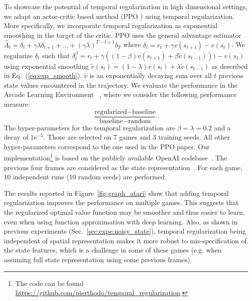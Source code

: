 \documentclass{article}
\newcommand{\param}{\beta}
\begin{document}
To showcase the potential of temporal regularization in high dimensional settings, we adapt an actor-critic based method (PPO \citep{schulman2017proximal}) using temporal regularization. More specifically, we incorporate temporal regularization as exponential smoothing in the target of the critic.  PPO uses the general advantage estimator $\hat{A}_t = \delta_t + \gamma \lambda \delta_{t+1} + ... + (\gamma \lambda)^{T-t+1} \delta_{T}$ where $\delta_t = r_t + \gamma v(s_{t+1}) - v(s_{t})$. We regularize $\delta_t$ such that $\delta_t^{\beta} = r_t + \gamma ((1-\beta)v(s_{t+1}) + \beta \widetilde{v}(s_{t-1}))) - v(s_{t})$ using exponential smoothing $\widetilde{v}(s_{t}) = (1-\lambda)v(s_t) + \lambda \widetilde{v}(s_{t-1})$ as described in Eq.~(\ref{eq:exp_smooth}). $\widetilde{v}$ is an exponentially decaying sum over all $t$ previous state values encountered in the trajectory.
We evaluate the performance in the Arcade Learning Environment ~\cite{bellemare2013arcade}, where we consider the following performance measure:
\begin{equation}
\label{eqn:expe:drl_measure}
    \frac{\text{regularized} - \text{baseline}}{\text{baseline} - \text{random}}.
\end{equation}
The hyper-parameters for the temporal regularization are $\param = \lambda = 0.2$ and a decay of $1\mathrm{e}^{-5}$. Those are selected on 7 games and 3 training seeds. All other hyper-parameters correspond to the one used in the PPO paper. Our implementation\footnote{The code can be found \url{https://github.com/pierthodo/temporal_regularization}.} is based on the publicly available OpenAI codebase~\cite{baselines}. The previous four frames are considered as the state representation~\citep{mnih2015human}.
For each game, $10$ independent runs ($10$ random seeds) are performed. 


The results reported in Figure~\ref{fig:graph_atari} show that adding temporal regularization improves the performance on multiple games. This suggests that the regularized optimal value function may be smoother and thus easier to learn, even when using function approximation with deep learning. Also, as shown in previous experiments (Sec.~\ref{sec:expe:noisy_state}), temporal regularization being independent of spatial representation makes it more robust to mis-specification of the state features, which is a challenge in some of these games (e.g. when assuming full state representation using some previous frames).
\end{document}
